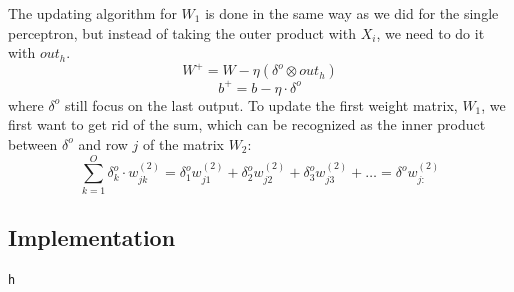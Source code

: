 \documentclass[norsk,a4paper,12pt]{article}
\begin{document}
The updating algorithm for $W_1$ is done in the same way as we did for the single perceptron, but instead of taking the outer product with $X_i$, we need to do it with $out_h$. 
\begin{equation}
W^+ = W - \eta(\delta^o\otimes out_h)
\end{equation}
\begin{equation}
b^+ = b - \eta\cdot\delta^o
\end{equation}
where $\delta^o$ still focus on the last output. To update the first weight matrix, $W_1$, we first want to get rid of the sum, which can be recognized as the inner product between $\delta^o$ and row $j$ of the matrix $W_2$:
\begin{equation}
\sum_{k=1}^{O}\delta_{k}^o\cdot w_{jk}^{(2)}=\delta_1^ow_{j1}^{(2)}+\delta_2^ow_{j2}^{(2)}+\delta_3^ow_{j3}^{(2)}+\hdots=\delta^ow_{j:}^{(2)}
\end{equation}


\subsection{Implementation}\label{sec:multi_implementation}
\begin{lstlisting}
h
\end{lstlisting}
\end{document}
